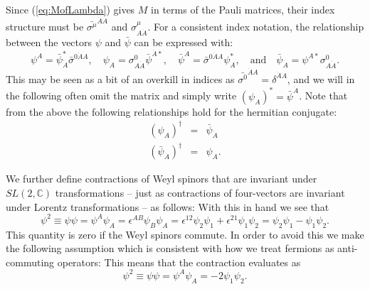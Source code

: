 \documentclass[notes.tex]{subfiles}
\begin{document}
Since (\ref{eq:MofLambda}) gives $M$ in terms of the Pauli matrices, their index structure must be $\bar{\sigma^\mu}^{\dot{A}A}$ and $\sigma^\mu_{A\dot{A}}$. 
For a consistent index notation, the relationship between the vectors $\psi$ and $\bar{\psi}$ can be expressed with:
\[  \psi^A = \bar\psi_{\dot{A}}^*\bar{\sigma}^{0\dot{A}A}, \quad  \psi_A = {\sigma}^0_{A\dot{A}}\bar\psi^{\dot{A}*}, \quad  \bar{\psi}^{\dot{A}} = \bar{\sigma}^{0\dot{A}A}\psi_A^*, \quad \text{and}\quad  \bar{\psi}_{\dot{A}} =\psi^{A*} \sigma^0_{A\dot{A}} .\]
This may be seen as a bit of an overkill in indices as $\bar{\sigma^0}^{\dot{A}A} = \delta^{\dot{A}A}$, and we will in the following often omit the matrix and simply write $(\psi_A)^* = \bar{\psi}^{\dot{A}}$.
Note that from the above the following relationships hold for the hermitian conjugate:
\begin{eqnarray*}
(\psi_A)^\dagger &=& \bar{\psi}_{\dot{A}} \\
(\bar{\psi}_{\dot{A}})^\dagger &=& \psi_A.
\end{eqnarray*}

We further define contractions of Weyl spinors that are invariant under $SL(2,\mathbb{C})$ transformations -- just as  contractions of four-vectors are invariant under Lorentz transformations -- as follows:
With this in hand we see that 
\[\psi^2 \equiv \psi \psi = \psi^A\psi_A = \epsilon^{AB}\psi_B\psi_A = \epsilon^{12}\psi_2\psi_1 + \epsilon^{21}\psi_1\psi_2 = \psi_2\psi_1 - \psi_1\psi_2.\]
This quantity is zero if the Weyl spinors commute. In order to avoid this we make the following assumption which is consistent with how we treat fermions as anti-commuting operators:
This means that the contraction evaluates as
\[\psi^2 \equiv \psi \psi = \psi^A\psi_A = -2 \psi_1\psi_2.\]


\end{document}
